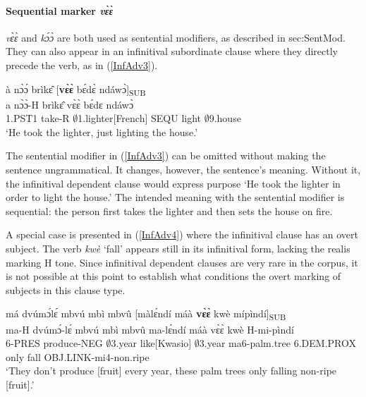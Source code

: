 \paragraph{Sequential marker {\itshape vɛ̀ɛ̀}}

{\itshape vɛ̀ɛ̀} and {\itshape kɔ́ɔ̀} are both used as sentential modifiers, as described in {sec:SentMod}. They can also appear in an infinitival subordinate clause where they directly precede the verb, as in (\ref{InfAdv3}). 


\begin{exe} 
\ex\label{InfAdv3} 
  \glll  à nɔ̀ɔ́ brìkɛ̂ [{\bfseries vɛ̀ɛ̀} bɛ́dɛ̀ ndáwɔ̀]\textsubscript{SUB} \\
         a nɔ̀ɔ̀-H brìkɛ̂ vɛ̀ɛ̀ bɛ́dɛ ndáwɔ̀ \\
           1.PST1 take-R $\emptyset$1.lighter[French] SEQU light $\emptyset$9.house \\
    \trans `He took the lighter, just lighting the house.'
\end{exe}

\noindent The sentential modifier in (\ref{InfAdv3}) can be omitted without making the sentence ungrammatical. It changes, however, the sentence's meaning. Without it, the infinitival dependent clause would express purpose `He took the lighter in order to light the house.' The intended meaning with the  sentential modifier is sequential: the person first takes the lighter and then sets the house on fire.

A special case is presented in (\ref{InfAdv4}) where the infinitival clause has an overt subject. The verb {\itshape kwè} `fall' appears still in its infinitival form, lacking the realis marking H tone. Since infinitival dependent clauses are very rare in the corpus, it is not possible at this point to establish what conditions the overt marking of subjects in this clause type. 

\begin{exe} 
\ex\label{InfAdv4} 
  \glll  má dvúmɔ́lɛ́ mbvú mbì mbvû [màlɛ́ndí máà {\bfseries vɛ̀ɛ̀} kwè mípìndí]\textsubscript{SUB} \\
        ma-H dvúmɔ́-lɛ́ mbvú mbì mbvû ma-lɛ́ndí máà vɛ̀ɛ̀ kwè H-mi-pìndí \\
           6-PRES produce-NEG  $\emptyset$3.year like[Kwasio] $\emptyset$3.year ma6-palm.tree 6.DEM.PROX only fall OBJ.LINK-mi4-non.ripe\\
    \trans `They don't produce [fruit] every year, these palm trees only falling non-ripe [fruit].'
\end{exe}

